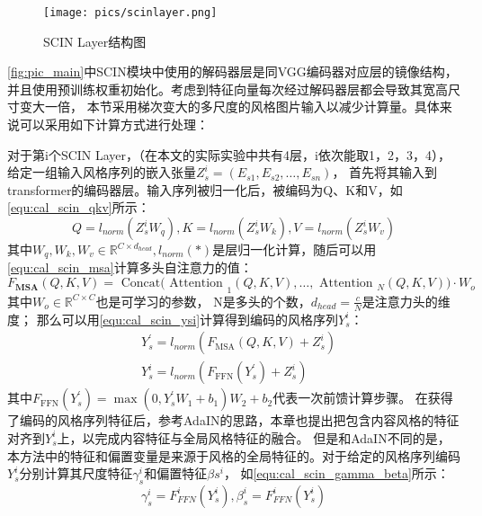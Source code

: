 \begin{figure}[htbp]
    \centering
    \texttt{[image: pics/scinlayer.png]}
    \caption{\label{fig:pic_scinlayer}SCIN Layer结构图}
\end{figure}
\autoref{fig:pic_main}中SCIN模块中使用的解码器层是同VGG编码器对应层的镜像结构，并且使用预训练权重初始化。考虑到特征向量每次经过解码器层都会导致其宽高尺寸变大一倍，
本节采用梯次变大的多尺度的风格图片输入以减少计算量。具体来说可以采用如下计算方式进行处理：
\par 对于第i个SCIN Layer，（在本文的实际实验中共有4层，i依次能取1，2，3，4），给定一组输入风格序列的嵌入张量\(Z_{s}^{i}=(E_{s1},E_{s2},\ldots,E_{sn})\)，
首先将其输入到transformer的编码器层。输入序列被归一化后，被编码为Q、K和V，如\autoref{equ:cal_scin_qkv}所示：
\begin{equation}
    \label{equ:cal_scin_qkv}
    Q=l_{norm}(Z_{s}^{i}W_{q}),K=l_{norm}(Z_{s}^{i}W_{k}),V=l_{norm}(Z_{s}^{i}W_{v})
\end{equation}
其中\(W_q,W_k,W_v\in\mathbb{R}^{C\times d_{head}},l_{norm}(*)\)是层归一化计算，随后可以用\autoref{equ:cal_scin_msa}计算多头自注意力的值：
\begin{equation}
    \label{equ:cal_scin_msa}
    F_{\mathbf{MSA}}(Q,K,V)=\text{ Concat( Attention }_1(Q,K,V),\ldots,\text{ Attention }_N(Q,K,V))\cdot W_o
\end{equation}
其中$W_o\in\mathbb{R}^{C\times C}$也是可学习的参数， N是多头的个数，\(d_{head}=\frac cN\)是注意力头的维度；
那么可以用\autoref{equ:cal_scin_ysi}计算得到编码的风格序列$Y_s^i$：
\begin{equation}
    \label{equ:cal_scin_ysi}
    \begin{aligned}&Y_s^{\prime}=l_{norm}(F_{\mathrm{MSA}}(Q,K,V)+Z_s^i)\\&Y_s^i=l_{norm}(F_{\mathrm{FFN}}(Y_s^{\prime})+Z_s^i)\end{aligned}
\end{equation}
其中$F_{\mathrm{FFN}}(Y_{s}^{\prime})=\max(0,Y_{s}^{\prime}W_{1}+b_{1})W_{2}+b_{2}$代表一次前馈计算步骤。
在获得了编码的风格序列特征后，参考AdaIN的思路，本章也提出把包含内容风格的特征对齐到$Y_s^i$上，以完成内容特征与全局风格特征的融合。
但是和AdaIN不同的是，本方法中的特征和偏置变量是来源于风格的全局特征的。对于给定的风格序列编码$Y_s^i$分别计算其尺度特征\(\gamma_{s}^{i}\)和偏置特征\(\beta{s}^{i}\)，
如\autoref{equ:cal_scin_gamma_beta}所示：
\begin{equation}
    \label{equ:cal_scin_gamma_beta}
    \gamma_s^i=F_{FFN}^i(Y_s^i),\beta_s^i=F_{FFN}^i(Y_s^i)
\end{equation}
